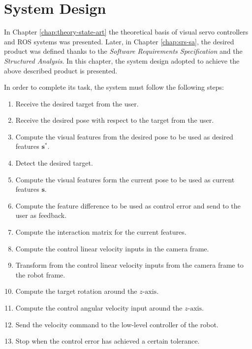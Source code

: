 
\chapter{System Design}
\label{chap:system-design}

In Chapter \ref{chap:theory-state-art} the theoretical basis of visual servo controllers and ROS systems was presented. Later, in Chapter \ref{chap:srs-sa}, the desired product was defined thanks to the \emph{Software Requirements Specification} and the \emph{Structured Analysis}. In this chapter, the system design adopted to achieve the above described product is presented.

In order to complete its task, the system must follow the following steps:

\begin{enumerate}
	\item Receive the desired target from the user.
	
	\item Receive the desired pose with respect to the target from the user.
	
	\item Compute the visual features from the desired pose to be used as desired features $\bm{s}^\ast$.
	
	\item Detect the desired target.
	
	\item Compute the visual features form the current pose to be used as current features $\bm{s}$.
	
	\item Compute the feature difference to be used as control error and send to the user as feedback.
	
	\item Compute the interaction matrix for the current features.
	
	\item Compute the control linear velocity inputs in the camera frame.
	
	\item Transform from the control linear velocity inputs from the camera frame to the robot frame.
	
	\item Compute the target rotation around the $z\text{-axis}$.
	
	\item Compute the control angular velocity input around the $z\text{-axis}$.
	
	\item Send the velocity command to the low-level controller of the robot.
	
	\item Stop when the control error has achieved a certain tolerance.
\end{enumerate}
	
